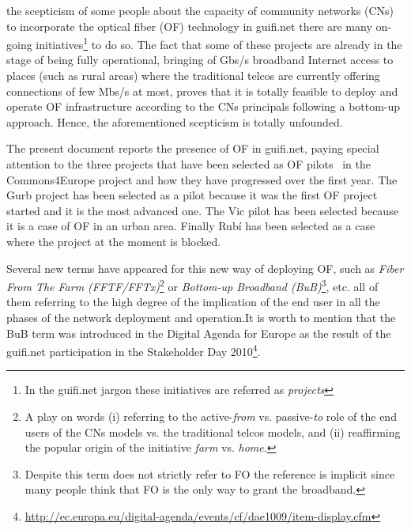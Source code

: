  the scepticism of some people about the capacity of community networks (CNs) to incorporate the optical fiber (OF) technology in guifi.net there are many on-going initiatives\footnote{In the guifi.net jargon these initiatives are referred as \emph{projects}} to do so. The fact that some of these projects are already in the stage of being fully operational, bringing of Gbs/s broadband Internet access to places (such as rural areas) where the traditional telcos are currently offering connections of few Mbs/s at most, proves that it is totally feasible to deploy and operate OF infrastructure according to the CNs principals following a bottom-up approach. Hence, the aforementioned scepticism is totally unfounded.

The present document reports the presence of OF in guifi.net, paying special attention to the three projects that have been selected as OF pilots~\cite{barcelo2012bub} in the Commons4Europe project and how they have progressed over the first year. The Gurb project has been selected as a pilot because it was the first OF project started and it is the most advanced one. The Vic pilot has been selected because it is a case of OF in an urban area. Finally Rub\'{i} has been selected as a case where the project at the moment is blocked.

Several new terms have appeared for this new way of deploying OF, such as \emph{Fiber From The Farm (FFTF/FFTx)}\footnote{A play on words (i) referring to the active-\emph{from} vs. passive-\emph{to} role of the end users of the CNs models vs. the traditional telcos models, and (ii) reaffirming the popular origin of the initiative \emph{farm} vs. \emph{home}. } or \emph{Bottom-up Broadband (BuB)}\footnote{Despite this term does not strictly refer to FO the reference is implicit since many people think that FO is the only way to grant the broadband.}, etc. all of them referring to the high degree of the implication of the end user in all the phases of the network deployment and operation.It is worth to mention that the BuB term was introduced in the Digital Agenda for Europe as the result of the guifi.net participation in the Stakeholder Day 2010\footnote{\url{http://ec.europa.eu/digital-agenda/events/cf/dae1009/item-display.cfm}}. 

